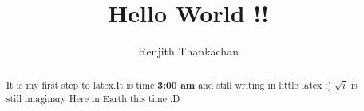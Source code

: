 \documentclass[]{article}
\begin{document}
\title{Hello World !!}
\author{Renjith Thankachan}
\maketitle

\begin{abstract}
It is my first step to latex.It is time \textbf{3:00 am} and still writing in little latex :) 
$\sqrt{i}$ is still imaginary Here in Earth this time :D
\end{abstract}
\end{document}
